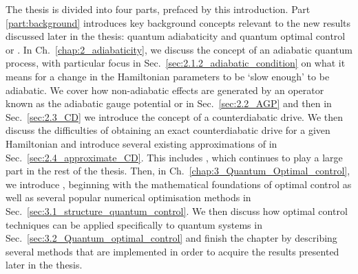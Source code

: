 The thesis is divided into four parts, prefaced by this introduction. Part \ref{part:background} introduces key background concepts relevant to the new results discussed later in the thesis: quantum adiabaticity and quantum optimal control or . In Ch.~\ref{chap:2_adiabaticity}, we discuss the concept of an adiabatic quantum process, with particular focus in Sec.~\ref{sec:2.1.2_adiabatic_condition} on what it means for a change in the Hamiltonian parameters to be `slow enough' to be adiabatic. We cover how non-adiabatic effects are generated by an operator known as the adiabatic gauge potential or  in Sec.~\ref{sec:2.2_AGP} and then in Sec.~\ref{sec:2.3_CD} we introduce the concept of a counterdiabatic drive. We then discuss the difficulties of obtaining an exact counterdiabatic drive for a given Hamiltonian and introduce several existing approximations of  in Sec.~\ref{sec:2.4_approximate_CD}. This includes , which continues to play a large part in the rest of the thesis. Then, in Ch.~\ref{chap:3_Quantum_Optimal_control}, we introduce , beginning with the mathematical foundations of optimal control as well as several popular numerical optimisation methods in Sec.~\ref{sec:3.1_structure_quantum_control}. We then discuss how optimal control techniques can be applied specifically to quantum systems in Sec.~\ref{sec:3.2_Quantum_optimal_control} and finish the chapter by describing several  methods that are implemented in order to acquire the results presented later in the thesis.

